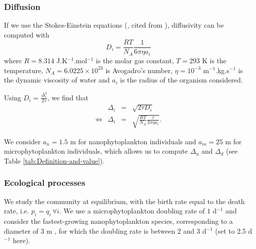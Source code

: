 \documentclass[english]{article}
\begin{document}
\subsubsection*{Diffusion}

If we use the Stokes-Einstein equations (\citealp{einstein1905molekularkinetischen},
cited from \citealp{dusenbery_2009}), diffusivity can be computed
with
\begin{equation}
D_{i}=\frac{RT}{N_{A}}\frac{1}{6\pi\eta a_{i}}
\end{equation}
where $R=8.314$ J.K$^{-1}$.mol$^{-1}$ is the molar gas constant,
$T=293$ K is the temperature, $N_{A}=6.0225\times10^{23}$ is Avogadro's
number, $\eta=10^{-3}$ m$^{-1}.$kg.s$^{-1}$ is the dynamic viscosity
of water and $a_{i}$ is the radius of the organism considered.

Using $D_{i}=\frac{\Delta_{i}^{2}}{2\tau}$, we find that
\begin{equation}
\begin{array}{cccc}
 & \Delta_{i} & = & \sqrt{2\tau D_{i}}\\
\Leftrightarrow & \Delta_{i} & = & \sqrt{\frac{RT}{N_{A}}\frac{\tau}{3\pi\eta a_{i}}}.
\end{array}
\end{equation}

We consider $a_{n}=1.5$ \textmu m for nanophytoplankton individuals
and $a_{m}=25$ \textmu m for microphytoplankton individuals, which
allows us to compute $\Delta_{n}$ and $\Delta_{d}$ (see Table \ref{tab:Definition-and-value}).

\subsubsection*{Ecological processes}

We study the community at equilibrium, with the birth rate equal to
the death rate, i.e. $p_{i}=q_{i}\,\forall i$. We use a microphytoplankton
doubling rate of $1$ d$^{-1}$ \citep{bissinger_predicting_2008}
and consider the fastest-growing nanophytoplankton species, corresponding
to a diameter of 3 \textmu m \citep{bec_growth_2008}, for which
the doubling rate is between 2 and 3 d$^{-1}$ (set to 2.5 d$^{-1}$
here).
\end{document}
